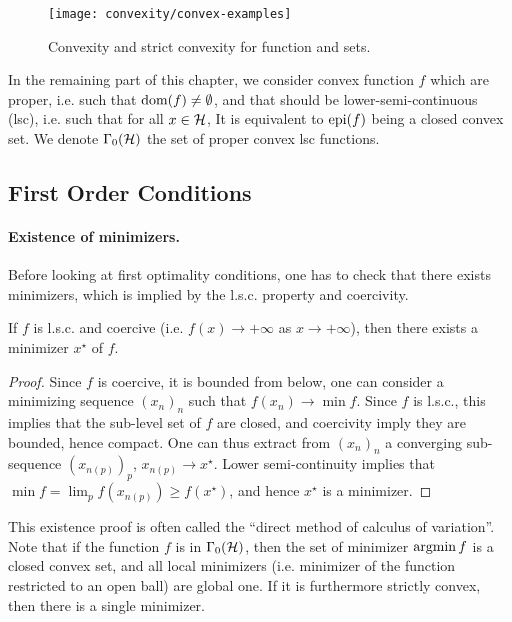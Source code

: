 \begin{figure}
\centering
\texttt{[image: convexity/convex-examples]}
\caption{\label{fig-convex-examples}
Convexity and strict convexity for function and sets.}
\end{figure}




In the remaining part of this chapter, we consider convex function $f$ which are proper, i.e. such that $\operatorname{dom}(f) \neq \emptyset$, and that should be lower-semi-continuous (lsc), i.e. such that for all $x \in \mathcal{H}$, 
It is equivalent to $\operatorname{epi}(f)$ being a closed convex set.
%
We denote $\Gamma_0(\mathcal{H})$ the set of proper convex lsc functions.

\subsection{First Order Conditions}

\paragraph{Existence of minimizers.}

Before looking at first optimality conditions, one has to check that there exists minimizers, which is implied by the l.s.c. property and coercivity.

\begin{prop}
	If $f$ is l.s.c. and coercive (i.e. $f(x)\rightarrow +\infty$ as $x \rightarrow +\infty$), then there exists a minimizer $x^\star$ of $f$. 
\end{prop}

\begin{proof}
Since $f$ is coercive, it is bounded from below, one can consider a minimizing sequence $(x_n)_n$ such that $f(x_n) \rightarrow \min f$. 
%
Since $f$ is l.s.c., this implies that the sub-level set of $f$ are closed, and coercivity imply they are bounded, hence compact. One can thus extract from $(x_n)_n$ a converging sub-sequence $(x_{n(p)})_p$, $x_{n(p)} \rightarrow x^\star$. Lower semi-continuity implies that $\min f = \lim_p f(x_{n(p)}) \geq f(x^\star)$, and hence $x^\star$ is a minimizer.
\end{proof}

This existence proof is often called the ``direct method of calculus of variation''.
%
Note that if the function $f$ is in $\Gamma_0(\mathcal{H})$, then the set of minimizer $\operatorname{argmin} f$ is a closed convex set, and all local minimizers (i.e. minimizer of the function restricted to an open ball) are global one. If it is furthermore strictly convex, then there is a single minimizer. 

